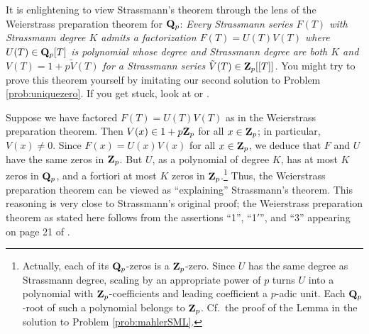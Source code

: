 \begin{rmk}
It is enlightening to view Strassmann's theorem through the lens of the \textsf{Weierstrass preparation theorem for $\mathbf{Q}_p$}: \emph{Every Strassmann series $F(T)$ with Strassmann degree $K$ admits a factorization $F(T) = U(T) V(T)$ where $U(T) \in \mathbf{Q}_p[T]$ is polynomial whose degree and Strassmann degree are both $K$ and $V(T) = 1 + p \tilde{V}(T)$ for a Strassmann series $\tilde{V}(T) \in \mathbf{Z}_p[[T]]$.} You might try to prove this theorem yourself by imitating our second solution to Problem \ref{prob:uniquezero}. If you get stuck, look at \cite[pp.~54--55]{lewis} or \cite[pp.~166--167]{skolem}.

Suppose we have factored $F(T)=U(T) V(T)$ as in the Weierstrass preparation theorem. Then $V(x)\in 1+p\mathbf{Z}_p$ for all $x \in \mathbf{Z}_p$; in particular, $V(x)\ne 0$.  Since $F(x) = U(x) V(x)$ for all $x \in \mathbf{Z}_p$, we deduce that $F$ and $U$ have the same zeros in $\mathbf{Z}_p$. But $U$, as a polynomial of degree $K$, has at most $K$ zeros in $\mathbf{Q}_p$, and a fortiori at most $K$ zeros in $\mathbf{Z}_p$.\footnote{Actually, each of its $\mathbf{Q}_p$-zeros is a $\mathbf{Z}_p$-zero. Since $U$ has the same degree as Strassmann degree, scaling by an appropriate power of $p$ turns $U$ into a polynomial with $\mathbf{Z}_p$-coefficients and leading coefficient a $p$-adic unit. Each $\mathbf{Q}_p$-root of such a polynomial belongs to $\mathbf{Z}_p$. Cf.~the proof of the Lemma in the solution to Problem \ref{prob:mahlerSML}.} Thus, the Weierstrass preparation theorem can be viewed as ``explaining'' Strassmann's theorem. This reasoning is very close to Strassmann's original proof; the Weierstrass preparation theorem as stated here follows from the assertions ``1'', ``1$'$'', and ``3'' appearing on page 21 of \cite{strassmann}. 
\end{rmk}



